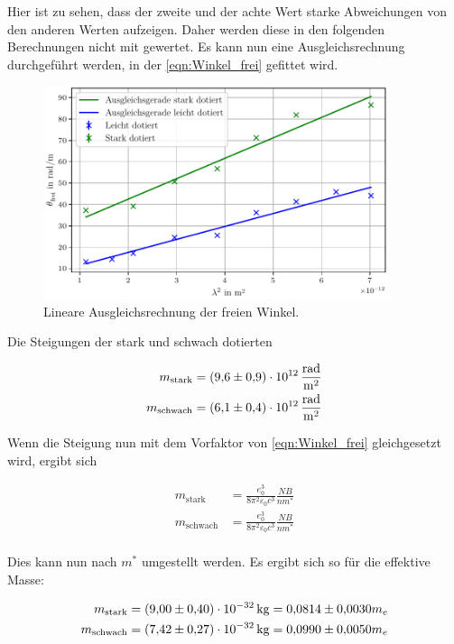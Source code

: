 \noindent Hier ist zu sehen, dass der zweite und der achte Wert starke Abweichungen von den anderen Werten 
aufzeigen. Daher werden diese in den folgenden Berechnungen nicht mit gewertet. Es kann nun eine Ausgleichsrechnung 
durchgeführt werden, in der \autoref{eqn:Winkel_frei} gefittet wird. 

\begin{figure}[H]
    \centering
    \includegraphics[width=0.9\textwidth]{LinRegress.pdf}
    \caption{Lineare Ausgleichsrechnung der freien Winkel.}
    \label{fig:LinRegress}
\end{figure}

\noindent Die Steigungen der stark und schwach dotierten  

\begin{align*}
    m_\text{stark}  &=\qty{9.6\pm0.9e12}{\radian \per \meter \squared}\\
    m_\text{schwach}&=\qty{6.1\pm0.4e12}{\radian \per \meter \squared}\\
\end{align*}

\noindent Wenn die Steigung nun mit dem Vorfaktor von \autoref{eqn:Winkel_frei} gleichgesetzt wird, ergibt sich

\begin{align*}
    m_\text{stark}  &=\frac{e_0^3}{8 \pi ^2 \varepsilon_0c^3} \frac{NB}{nm^*}\\
    m_\text{schwach}&=\frac{e_0^3}{8 \pi ^2 \varepsilon_0c^3} \frac{NB}{nm^*}\\
\end{align*}

\noindent Dies kann nun nach $m^*$ umgestellt werden. Es ergibt sich so für die effektive Masse:

\begin{align*}
    m_\text{stark}  &=\qty{9.00\pm0.40e-32}{\kilo \gram} = \num{0.0814\pm0.0030}m_e\\
    m_\text{schwach}&=\qty{7.42\pm0.27e-32}{\kilo \gram} = \num{0.0990\pm0.0050}m_e\\
\end{align*}




%
